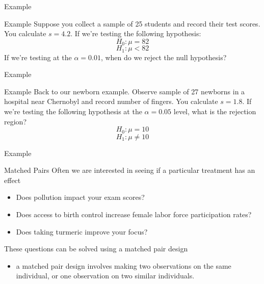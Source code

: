 \documentclass{beamer}
\begin{document}
\begin{frame}{Example}
\end{frame}


\begin{frame}{Example}
	Suppose you collect a sample of 25 students and record their test scores. You calculate $s=4.2$. If we're testing the following hypothesis:
	\[ 
		H_0: \mu=82
	\]
	\[ 
		H_1: \mu<82
	\]
	If we're testing at the $\alpha=0.01$, when do we reject the null hypothesis?
\end{frame}

\begin{frame}{Example}
\end{frame}

\begin{frame}{Example}
	Back to our newborn example. Observe sample of 27 newborns in a hospital near Chernobyl and record number of fingers. You calculate $s=1.8$. If we're testing the following hypothesis at the $\alpha=0.05$ level, what is the rejection region?
	\[ 
		H_0:\mu=10
	\]
	\[ 
		H_1:\mu \neq 10
	\]
\end{frame}

\begin{frame}{Example}
\end{frame}


\begin{frame}{Matched Pairs}
	Often we are interested in seeing if a particular treatment has an effect
	\begin{itemize}
		\item Does pollution impact your exam scores?
		\item Does access to birth control increase female labor force participation rates?
		\item Does taking turmeric improve your focus?
	\end{itemize}
	
	These questions can be solved using a \alert{matched pair design}
	\begin{itemize}
		\item a matched pair design involves making two observations on the same individual, or one observation on two similar individuals.
	\end{itemize}
\end{frame}
\end{document}
